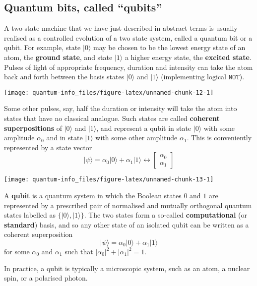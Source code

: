 \documentclass{article}
\newenvironment{idea}%
{\bigskip\noindent\begin{minipage}{\textwidth}\smallskip\begin{tcolorbox}[colback=gray!10,boxrule=0.01mm]}%
{\end{tcolorbox}\end{minipage}\bigskip}
\begin{document}
\hypertarget{quantum-bits-called-qubits}{%
\subsection{Quantum bits, called ``qubits''}\label{quantum-bits-called-qubits}}

A two-state machine that we have just described in abstract terms is usually realised as a controlled evolution of a two state system, called a quantum bit or a qubit.
For example, state \(|0\rangle\) may be chosen to be the lowest energy state of an atom, the \textbf{ground state}, and state \(|1\rangle\) a higher energy state, the \textbf{excited state}.
Pulses of light of appropriate frequency, duration and intensity can take the atom back and forth between the basis states \(|0\rangle\) and \(|1\rangle\) (implementing logical \(\texttt{NOT}\)).

\begin{center}\texttt{[image: quantum-info\_files/figure-latex/unnamed-chunk-12-1]} \end{center}

Some other pulses, say, half the duration or intensity will take the atom into states that have no classical analogue.
Such states are called \textbf{coherent superpositions} of \(|0\rangle\) and \(|1\rangle\), and represent a qubit in state \(|0\rangle\) with some amplitude \(\alpha_0\) and in state \(|1\rangle\) with some other amplitude \(\alpha_1\).
This is conveniently represented by a state vector
\[
    |\psi\rangle =
    \alpha_0|0\rangle + \alpha_1|1\rangle
    \leftrightarrow
    \begin{bmatrix}
      \alpha_0
    \\\alpha_1
    \end{bmatrix}
\]

\begin{center}\texttt{[image: quantum-info\_files/figure-latex/unnamed-chunk-13-1]} \end{center}

\begin{idea}

A \textbf{qubit} is a quantum system in which the Boolean states \(0\) and \(1\) are represented by a prescribed pair of normalised and mutually orthogonal quantum states labelled as \(\{|0\rangle,|1\rangle\}\).
The two states form a so-called \textbf{computational} (or \textbf{standard}) basis, and so any other state of an isolated qubit can be written as a coherent superposition
\[
    |\psi\rangle = \alpha_0|0\rangle + \alpha_1|1\rangle
  \]
for some \(\alpha_0\) and \(\alpha_1\) such that \(|\alpha_0|^2 + |\alpha_1|^2 = 1\).

In practice, a qubit is typically a microscopic system, such as an atom, a nuclear spin, or a polarised photon.

\end{idea}
\end{document}
